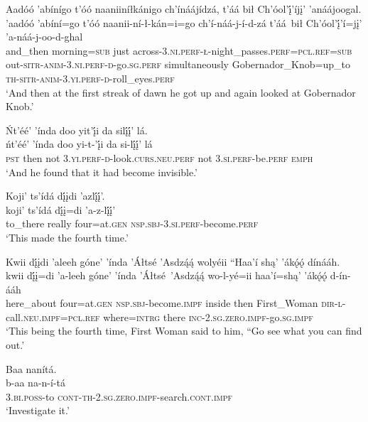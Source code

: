 \ea\label{ex:text5-5-1}
Aadóó ’abínígo t’óó naaniiníłkánigo ch’ínáájídzá, t’áá bił Ch’óol’į́’íjį’ ’anáájoogal.\\
\gll ’aadóó	’abíní=go	t’óó	naanii-ní-ł-kán=i=go	ch’í-náá-j-í-d-zá	t’áá~{bił}	Ch’óol’į́’í=jį’	’a-náá-j-oo-d-ghal\\
     and\_then	morning=\textsc{sub}	just	across-3.\textsc{ni}.\textsc{perf}-\textsc{ł}-night\_passes.\textsc{perf}=\textsc{pcl}.\textsc{ref}=\textsc{sub}	out-\textsc{sitr}-\textsc{anim}-3.\textsc{ni}.\textsc{perf}-\textsc{d}-go.\textsc{sg}.\textsc{perf}	simultaneously	Gobernador\_Knob=up\_to	\textsc{th}-\textsc{sitr}-\textsc{anim}-3.\textsc{yi}.\textsc{perf}-\textsc{d}-roll\_eyes.\textsc{perf}\\
\glt `And then at the first streak of dawn he got up and again looked at Gobernador Knob.'
\z

\ea\label{ex:text5-5-2}
Ńt’éé’ ’índa doo yit’į́i da silį́į́’ lá.\\
\gll ńt’éé’	’índa	doo	yi-t-’į́i	da	si-lį́į́’	lá\\
     \textsc{pst}	then	not	3.\textsc{yi}.\textsc{perf}-\textsc{d}-look.\textsc{curs}.\textsc{neu}.\textsc{perf}	not	3.\textsc{si}.\textsc{perf}-be.\textsc{perf}	\textsc{emph}\\
\glt `And he found that it had become invisible.'
\z

\ea\label{ex:text5-5-3}
Koji’ ts’ídá dį́įdi ’azlį́į́’.\\
\gll koji’	ts’ídá	dį́į=di	’a-z-lį́į́’\\
     to\_there	really	four=at.\textsc{gen}	\textsc{nsp}.\textsc{sbj}-3.\textsc{si}.\textsc{perf}-become.\textsc{perf}\\
\glt `This made the fourth time.'
\z

\newpage
\ea\label{ex:text5-5-4}
Kwii dį́įdi ’aleeh góne’ ’índa ’Áłtsé ’Asdzą́ą́ wolyéii ``Haa’í shą’ ’ákǫ́ǫ́ dínááh.\\
\gll kwii	dį́į=di	’a-leeh	góne’	’índa	’Áłtsé~{’Asdzą́ą́}	wo-l-yé=ii	haa’í=shą’	’ákǫ́ǫ́	d-ín-ááh\\
     here\_about	four=at.\textsc{gen}	\textsc{nsp}.\textsc{sbj}-become.\textsc{impf}	inside	then	First\_Woman	\textsc{dir}-\textsc{l}-call.\textsc{neu}.\textsc{impf}=\textsc{pcl}.\textsc{ref}	where=\textsc{intrg}	there	\textsc{inc}-2.\textsc{sg}.\textsc{zero}.\textsc{impf}-go.\textsc{sg}.\textsc{impf}\\
\glt `This being the fourth time, First Woman said to him, “Go see what you can find out.'
\z

\ea\label{ex:text5-5-5}
Baa nanítá.\\
\gll b-aa	na-n-í-tá\\
     3.\textsc{bi}.\textsc{poss}-to	\textsc{cont}-\textsc{th}-2.\textsc{sg}.\textsc{zero}.\textsc{impf}-search.\textsc{cont}.\textsc{impf}\\
\glt `Investigate it.'
\z

